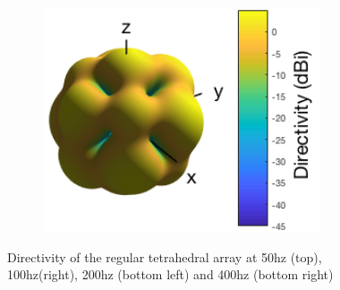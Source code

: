 \begin{figure}[H]
\begin{subfigure}{.5\textwidth}
    \label{fig:directivity200hzregulartetra}
\end{subfigure}%
\begin{subfigure}{.5\textwidth}
    \centering
        \includegraphics[width=0.9\textwidth]{Figures/regulartetra400hz.png}
    \label{fig:directivity400hzregulartetra}
\end{subfigure}
\caption{Directivity of the regular tetrahedral array at 50hz (top), 100hz(right), 200hz (bottom left) and 400hz (bottom right)}
\label{fig:directivityregulartetra}
\end{figure}


